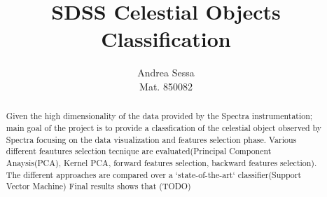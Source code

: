 \documentclass[a4paper,10pt]{article}
\title{SDSS Celestial Objects Classification}
\author{Andrea Sessa \\ \vspace{1cm} \small{Mat. 850082}}
\begin{document}
\maketitle

\begin{abstract}
  Given the high dimensionality of the data provided by the Spectra instrumentation; main goal of the project
  is to provide a classfication of the celestial object observed by Spectra focusing on the data visualization 
  and features selection phase.\newline
  Various different feautures selection tecnique are evaluated(Principal Component Anaysis(PCA), Kernel PCA, forward features selection,
  backward features selection). The different approaches are compared over a `state-of-the-art` classifier(Support Vector Machine)\newline
  Final results shows that (TODO)
\end{abstract}

\newpage

\tableofcontents

\newpage

\listoffigures

\newpage
\end{document}
